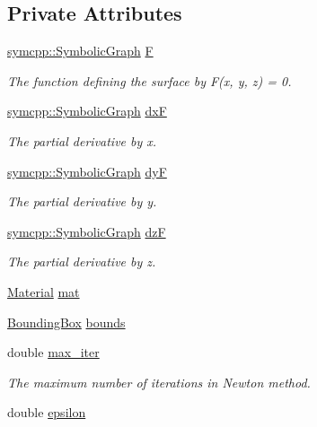 \subsection*{Private Attributes}
\begin{DoxyCompactItemize}
\item 
\mbox{\hyperlink{classsymcpp_1_1SymbolicGraph}{symcpp\+::\+Symbolic\+Graph}} \mbox{\hyperlink{classImplicitSurface_aeeafee33bf827627323373167ce841eb}{F}}
\begin{DoxyCompactList}\small\item\em The function defining the surface by F(x, y, z) = 0. \end{DoxyCompactList}\item 
\mbox{\hyperlink{classsymcpp_1_1SymbolicGraph}{symcpp\+::\+Symbolic\+Graph}} \mbox{\hyperlink{classImplicitSurface_a9861b92609a363bf78d73347a9272b5d}{dxF}}
\begin{DoxyCompactList}\small\item\em The partial derivative by x. \end{DoxyCompactList}\item 
\mbox{\hyperlink{classsymcpp_1_1SymbolicGraph}{symcpp\+::\+Symbolic\+Graph}} \mbox{\hyperlink{classImplicitSurface_a49145c0375f0adc02157b9368e733aa2}{dyF}}
\begin{DoxyCompactList}\small\item\em The partial derivative by y. \end{DoxyCompactList}\item 
\mbox{\hyperlink{classsymcpp_1_1SymbolicGraph}{symcpp\+::\+Symbolic\+Graph}} \mbox{\hyperlink{classImplicitSurface_aab31834ea321e276bb85348d7a7464f2}{dzF}}
\begin{DoxyCompactList}\small\item\em The partial derivative by z. \end{DoxyCompactList}\item 
\mbox{\hyperlink{classMaterial}{Material}} \mbox{\hyperlink{classImplicitSurface_adbb94dbb4d3271d5ed18752dde4aac32}{mat}}
\item 
\mbox{\hyperlink{classBoundingBox}{Bounding\+Box}} \mbox{\hyperlink{classImplicitSurface_a1332a4975d57ce5f91450221541df82a}{bounds}}
\item 
double \mbox{\hyperlink{classImplicitSurface_ad92c06925b2496b7fe3a1d2659a87075}{max\+\_\+iter}}
\begin{DoxyCompactList}\small\item\em The maximum number of iterations in Newton method. \end{DoxyCompactList}\item 
double \mbox{\hyperlink{classImplicitSurface_aa870a11380d4bc4c019d9d250e7ccc9c}{epsilon}}
\end{DoxyCompactItemize}


